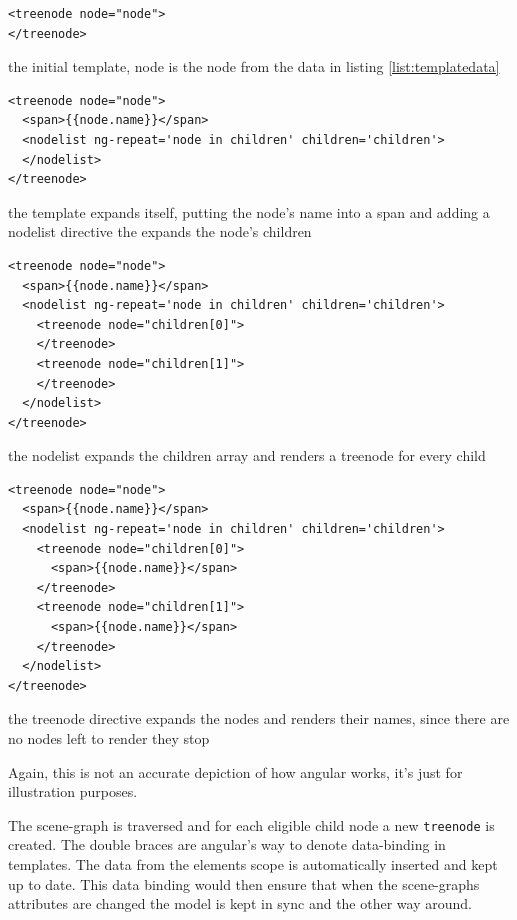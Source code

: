 \begin{listing}[H]
  \begin{verbatim}
<treenode node="node">
</treenode>
  \end{verbatim}
  \caption{the initial template, node is the node from the data in listing \ref{list:templatedata}}
  \label{list:angular1}
\end{listing}

\begin{listing}[H]
  \begin{verbatim}
<treenode node="node">
  <span>{{node.name}}</span>
  <nodelist ng-repeat='node in children' children='children'>
  </nodelist>
</treenode>
  \end{verbatim}
  \caption{the template expands itself, putting the node's name into a span and adding a nodelist directive the expands the node's children}
  \label{list:angular2}
\end{listing}

\begin{listing}[H]
  \begin{verbatim}
<treenode node="node">
  <span>{{node.name}}</span>
  <nodelist ng-repeat='node in children' children='children'>
    <treenode node="children[0]">
    </treenode>
    <treenode node="children[1]">
    </treenode>
  </nodelist>
</treenode>
  \end{verbatim}
  \caption{the nodelist expands the children array and renders a treenode for every child}
  \label{list:angular3}
\end{listing}

\begin{listing}[H]
  \begin{verbatim}
<treenode node="node">
  <span>{{node.name}}</span>
  <nodelist ng-repeat='node in children' children='children'>
    <treenode node="children[0]">
      <span>{{node.name}}</span>
    </treenode>
    <treenode node="children[1]">
      <span>{{node.name}}</span>
    </treenode>
  </nodelist>
</treenode>
  \end{verbatim}
  \caption{the treenode directive expands the nodes and renders their names, since there are no nodes left to render they stop}
  \label{list:angular4}
\end{listing}


Again, this is not an accurate depiction of how angular works, it's just
for illustration purposes.

The scene-graph is traversed and for each eligible child node a new
\texttt{treenode} is created. The double braces are angular's way
to denote data-binding in templates. The data from the elements scope is
automatically inserted and kept up to date. This data binding would then
ensure that when the scene-graphs attributes are changed the model is
kept in sync and the other way around.

